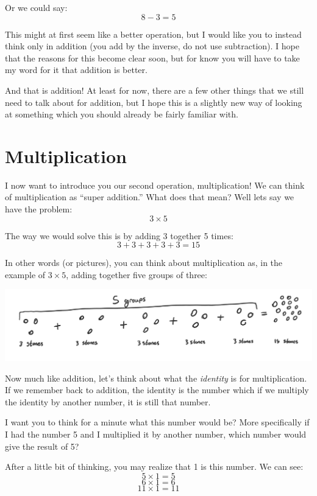 \documentclass{article}
\begin{document}
Or we could say: 
\[ 8 - 3 = 5 \]

This might at first seem like a better operation, but I would like you to instead think only in addition (you add by the inverse, do not use subtraction). I hope that the reasons for this become clear soon, but for know you will have to take my word for it that addition is better.

And that is addition! At least for now, there are a few other things that we still need to talk about for addition, but I hope this is a slightly new way of looking at something which you should already be fairly familiar with. 

\section*{Multiplication}

I now want to introduce you our second operation, multiplication! We can think of multiplication as ``super addition.'' What does that mean? Well lets say we have the problem: 
\[ 3 \times 5 \]

The way we would solve this is by adding 3 together 5 times: 
\[ 3 + 3 + 3 + 3 + 3 = 15 \]

In other words (or pictures), you can think about multiplication as, in the example of $3 \times 5$, adding together five groups of three: 

\begin{center}
    \includegraphics[scale=0.35]{chap1images/chapter1_draw4.png}
\end{center}

Now much like addition, let's think about what the \textit{identity} is for multiplication. If we remember back to addition, the identity is the number which if we multiply the identity by another number, it is still that number. 

I want you to think for a minute what this number would be? More specifically if I had the number 5 and I multiplied it by another number, which number would give the result of 5?

After a little bit of thinking, you may realize that 1 is this number. We can see: 
\[ 5 \times 1 = 5 \]
\[ 6 \times 1 = 6 \]
\[ 11 \times 1 = 11 \]
\end{document}
